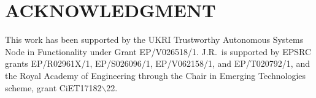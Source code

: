 \documentclass[letterpaper, 10 pt, conference]{ieeeconf}  %
\begin{document}
	
	\section*{ACKNOWLEDGMENT}
	This work has been supported by the UKRI Trustworthy Autonomous Systems Node in Functionality under Grant EP/V026518/1. J.R.\ is supported by EPSRC grants EP/R02961X/1, EP/S026096/1, EP/V062158/1, and EP/T020792/1, and the Royal Academy of Engineering through the Chair in Emerging Technologies scheme, grant CiET17182$\backslash$22.
	
	
	
			
\end{document}
